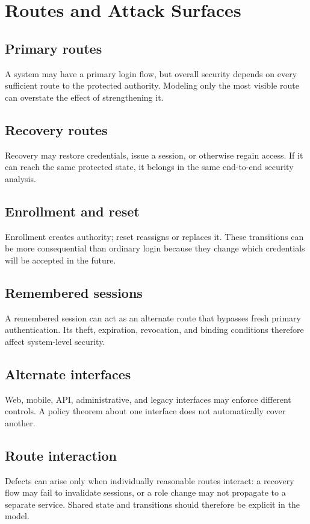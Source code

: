 \documentclass[11pt,oneside]{book}
\theoremstyle{definition}
\theoremstyle{remark}
\begin{document}
\chapter{Routes and Attack Surfaces}
\label{ch:routes}
\section{Primary routes}
A system may have a primary login flow, but overall security depends on every sufficient route to the protected authority. Modeling only the most visible route can overstate the effect of strengthening it.

\section{Recovery routes}
Recovery may restore credentials, issue a session, or otherwise regain access. If it can reach the same protected state, it belongs in the same end-to-end security analysis.

\section{Enrollment and reset}
Enrollment creates authority; reset reassigns or replaces it. These transitions can be more consequential than ordinary login because they change which credentials will be accepted in the future.

\section{Remembered sessions}
A remembered session can act as an alternate route that bypasses fresh primary authentication. Its theft, expiration, revocation, and binding conditions therefore affect system-level security.

\section{Alternate interfaces}
Web, mobile, API, administrative, and legacy interfaces may enforce different controls. A policy theorem about one interface does not automatically cover another.

\section{Route interaction}
Defects can arise only when individually reasonable routes interact: a recovery flow may fail to invalidate sessions, or a role change may not propagate to a separate service. Shared state and transitions should therefore be explicit in the model.
\end{document}
